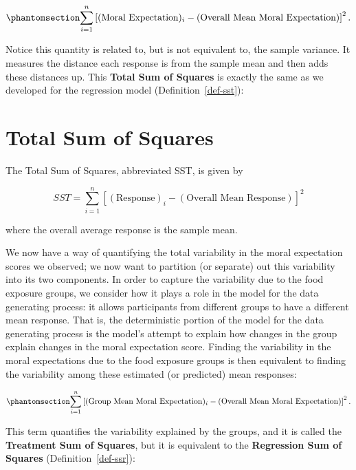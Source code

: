 \documentclass[
  letterpaper,
  DIV=11,
  numbers=noendperiod]{scrreprt}
\theoremstyle{definition}
\theoremstyle{definition}
\theoremstyle{plain}
\theoremstyle{remark}
\begin{document}
\begin{equation}\phantomsection\label{eq-anovateststat-sst}{\sum_{i=1}^{n} \left[(\text{Moral Expectation})_i - (\text{Overall Mean Moral Expectation})\right]^2.}\end{equation}

Notice this quantity is related to, but is not equivalent to, the sample
variance. It measures the distance each response is from the sample mean
and then adds these distances up. This \textbf{Total Sum of Squares} is
exactly the same as we developed for the regression model
(Definition~\ref{def-sst}):

\section{Total Sum of Squares}\label{total-sum-of-squares-1}

The Total Sum of Squares, abbreviated SST, is given by

\[SST = \sum_{i=1}^{n} \left[(\text{Response})_i - (\text{Overall Mean Response})\right]^2\]

where the overall average response is the sample mean.

We now have a way of quantifying the total variability in the moral
expectation scores we observed; we now want to partition (or separate)
out this variability into its two components. In order to capture the
variability due to the food exposure groups, we consider how it plays a
role in the model for the data generating process: it allows
participants from different groups to have a different mean response.
That is, the deterministic portion of the model for the data generating
process is the model's attempt to explain how changes in the group
explain changes in the moral expectation score. Finding the variability
in the moral expectations due to the food exposure groups is then
equivalent to finding the variability among these estimated (or
predicted) mean responses:

\begin{equation}\phantomsection\label{eq-anovateststat-ssr}{\sum_{i=1}^{n} \left[(\text{Group Mean Moral Expectation})_i - (\text{Overall Mean Moral Expectation})\right]^2.}\end{equation}

This term quantifies the variability explained by the groups, and it is
called the \textbf{Treatment Sum of Squares}, but it is equivalent to
the \textbf{Regression Sum of Squares} (Definition~\ref{def-ssr}):
\end{document}
